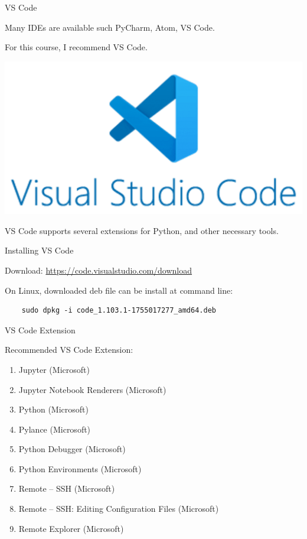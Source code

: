 \documentclass[aspectratio=169,xcolor=dvipsnames,svgnames,x11names,fleqn]{beamer}
\begin{document}
\begin{frame}{VS Code}
    
    Many IDEs are available such PyCharm, Atom, VS Code.

    \vspace{10pt}

    For this course, I recommend VS Code.

    \begin{center}
        \includegraphics[width=\textwidth,height=0.45\textheight,keepaspectratio]{figures/vscode.png}
    \end{center}

    VS Code supports several extensions for Python, and other necessary tools.

\end{frame}

\begin{frame}[containsverbatim]{Installing VS Code}

    Download: \url{https://code.visualstudio.com/download}

    On Linux, downloaded deb file can be install at command line:

    \begin{verbatim}
    sudo dpkg -i code_1.103.1-1755017277_amd64.deb
    \end{verbatim}
    
\end{frame}

\begin{frame}{VS Code Extension}

    Recommended VS Code Extension:
    \footnotesize
    \begin{enumerate}
        \item Jupyter (Microsoft)
        \item Jupyter Notebook Renderers (Microsoft)
        \item Python (Microsoft)
        \item Pylance (Microsoft)
        \item Python Debugger (Microsoft)
        \item Python Environments (Microsoft)
        \item Remote -- SSH (Microsoft)
        \item Remote -- SSH: Editing Configuration Files (Microsoft)
        \item Remote Explorer (Microsoft)
    \end{enumerate}
    
\end{frame}
\end{document}

